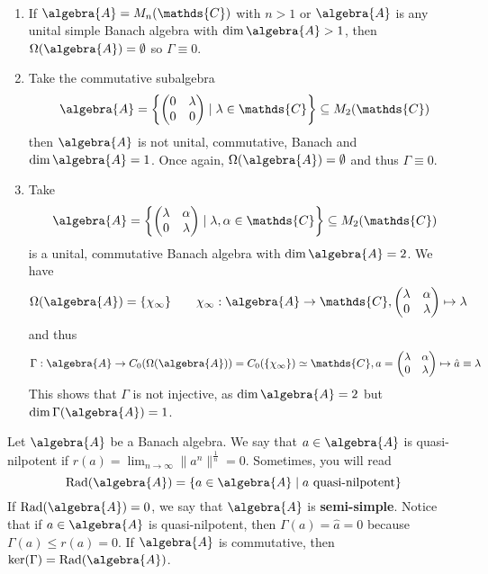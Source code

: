 \documentclass[a4paper]{article}
\begin{document}
\begin{example}~
	\begin{enumerate}
		\item If $\algebra{A} = M_n(\mathds{C})$ with $n > 1$ or $\algebra{A}$ is any unital simple Banach algebra with $\dim \algebra{A} > 1$, then $\Omega(\algebra{A}) = \emptyset$ so $\Gamma \equiv 0$.
		\item Take the commutative subalgebra
		      \begin{equation*}
			      \algebra{A} = \left\{ \qmatrix{0 & \lambda \\ 0 & 0} \mid \lambda \in \mathds{C} \right\} \subseteq M_2(\mathds{C})
		      \end{equation*}
		      then $\algebra{A}$ is not unital, commutative, Banach and $\dim \algebra{A} = 1$. Once again, $\Omega(\algebra{A}) = \emptyset$ and thus $\Gamma \equiv 0$.
		\item Take
		      \begin{equation*}
			      \algebra{A} = \left\{ \qmatrix{\lambda & \alpha \\ 0 & \lambda} \mid \lambda, \alpha \in \mathds{C} \right\} \subseteq M_2(\mathds{C})
		      \end{equation*}
		      is a unital, commutative Banach algebra with $\dim \algebra{A} = 2$. We have
		      \begin{equation*}
			      \Omega(\algebra{A}) = \{\chi_\infty\} \qquad \chi_\infty: \algebra{A} \to \mathds{C},  \qmatrix{\lambda & \alpha \\ 0 & \lambda}  \mapsto \lambda
		      \end{equation*}
		      and thus
		      \begin{equation*}
			      \Gamma: \algebra{A} \to C_0(\Omega(\algebra{A})) = C_0(\{\chi_\infty\}) \simeq \mathds{C}, a = \qmatrix{\lambda & \alpha \\ 0 & \lambda} \mapsto \hat a \equiv \lambda
		      \end{equation*}
		      This shows that $\Gamma$ is not injective, as $\dim \algebra{A} = 2$ but $\dim \Gamma(\algebra{A}) = 1$.
	\end{enumerate}
\end{example}

\begin{definition}
	Let $\algebra{A}$ be a Banach algebra. We say that $a \in \algebra{A}$ is quasi-nilpotent if $r(a) = \lim_{n \to \infty} \|a^n\|^{\frac{1}{n}} = 0$.
	Sometimes, you will read
	\begin{equation*}
		\mathrm{Rad}(\algebra{A})  = \{a \in \algebra{A} \mid a \text{ quasi-nilpotent}\}
	\end{equation*}
	If $\mathrm{Rad}(\algebra{A}) = 0$, we say that $\algebra{A}$ is \textbf{semi-simple}.
	Notice that if $a \in \algebra{A}$ is quasi-nilpotent, then $\Gamma(a) = \hat a = 0$ because $\Gamma(a) \leq r(a) = 0$.
	If $\algebra{A}$ is commutative, then $\ker(\Gamma) = \mathrm{Rad}(\algebra{A})$.
\end{definition}
\end{document}
